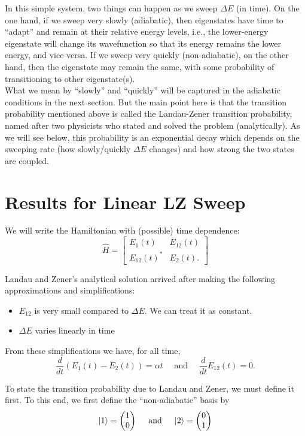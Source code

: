 \documentclass{article}
\theoremstyle{definition}
\newcommand{\al}{\alpha}
\newcommand{\f}[2]{\frac{#1}{#2}}
\begin{document}
In this simple system, two things can happen as we sweep $\Delta E$ (in time).  On the one hand, if we sweep very slowly (adiabatic), then eigenstates have time to ``adapt'' and remain at their relative energy levels, i.e., the lower-energy eigenstate will change its wavefunction so that its energy remains the lower energy, and vice versa. If we sweep very quickly (non-adiabatic), on the other hand, then the eigenstate may remain the same, with some probability of transitioning to other eigenstate(s). \\


What we mean by ``slowly'' and ``quickly'' will be captured in the adiabatic conditions in the next section. But the main point here is that the transition probability mentioned above is called the Landau-Zener transition probability, named after two physicists who stated and solved the problem (analytically). As we will see below, this probability is an exponential decay which depends on the sweeping rate (how slowly/quickly $\Delta E$ changes) and how strong the two states are coupled. 


\section{Results for Linear LZ Sweep}

We will write the Hamiltonian with (possible) time dependence:
\begin{equation*}
\widehat{H} = \begin{bmatrix}
E_1(t) & E_{12}(t) \\ E_{12}(t)^* & E_{2}(t).
\end{bmatrix}
\end{equation*}



Landau and Zener's analytical solution arrived after making the following approximations and simplifications: 
\begin{itemize}
	\item $E_{12}$ is very small compared to $\Delta E$. We can treat it as constant.
	\item $\Delta E$ varies linearly in time 
\end{itemize}

From these simplifications we have, for all time, 
\begin{equation*}
\f{d}{dt}(E_1(t) - E_2(t)) = \al t \quad \text{ and } \quad \f{d}{dt}{E_{12}(t)} = 0.
\end{equation*}

To state the transition probability due to Landau and Zener, we must define it first. To this end, we first define the ``non-adiabatic'' basis by 
\begin{equation*}
\ket{1} = \begin{pmatrix}
1 \\ 0
\end{pmatrix} \quad \text{ and }  \quad
\ket{2} = \begin{pmatrix}
0 \\ 1
\end{pmatrix}
\end{equation*}
\end{document}
